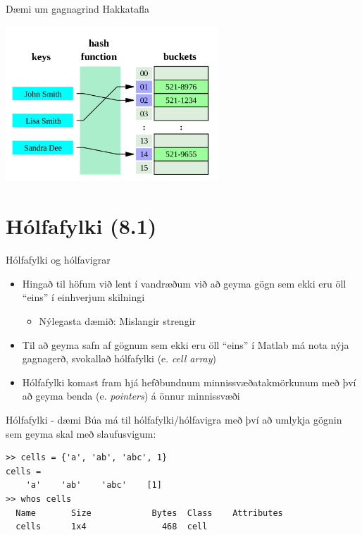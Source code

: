 \documentclass[handout]{beamer}
\begin{document}
\begin{frame}{Dæmi um gagnagrind}
Hakkatafla
\begin{center}
\includegraphics[width=0.6\textwidth]{Pics/hash-table}
\end{center}
\end{frame}

\section{Hólfafylki (8.1)}

\begin{frame}{Hólfafylki og hólfavigrar}
\begin{itemize}
 \item Hingað til höfum við lent í vandræðum við að geyma gögn sem ekki eru öll ``eins'' í einhverjum skilningi
 \begin{itemize}
  \item Nýlegasta dæmið: Mislangir strengir
 \end{itemize}
 \item Til að geyma safn af gögnum sem ekki eru öll ``eins'' í Matlab má nota nýja gagnagerð, svokallað hólfafylki (e. \emph{cell array})
 \item Hólfafylki komast fram hjá hefðbundnum minnissvæðatakmörkunum með því að geyma benda (e. \emph{pointers}) á önnur minnissvæði
\end{itemize}
\end{frame}

\begin{frame}[fragile]{Hólfafylki - dæmi}
Búa má til hólfafylki/hólfavigra með því að umlykja gögnin sem geyma skal með slaufusvigum:

\begin{verbatim}
>> cells = {'a', 'ab', 'abc', 1}
cells = 
    'a'    'ab'    'abc'    [1]
>> whos cells
  Name       Size            Bytes  Class    Attributes
  cells      1x4               468  cell
\end{verbatim}
\end{frame}
\end{document}

